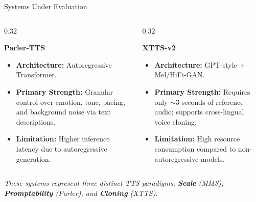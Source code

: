 \documentclass{beamer}
\begin{document}
\begin{frame}{Systems Under Evaluation}
\begin{columns}[t]
        \begin{column}{0.32\textwidth}
            \begin{block}{\centering \textbf{Parler-TTS}}
                \begin{itemize}\footnotesize
                    \setlength\itemsep{0.5em}
                    \item \textbf{Architecture:} Autoregressive Transformer.
                    \item \textbf{Primary Strength:} Granular control over emotion, tone, pacing, and background noise via text descriptions.
                    \item \textbf{Limitation:} Higher inference latency due to autoregressive generation.
                \end{itemize}
                \vspace{0.2cm}
            \end{block}
        \end{column}

        \begin{column}{0.32\textwidth}
            \begin{block}{\centering \textbf{XTTS-v2}}
                \begin{itemize}\footnotesize
                    \setlength\itemsep{0.5em}
                    \item \textbf{Architecture:} GPT-style + Mel/HiFi-GAN.
                    \item \textbf{Primary Strength:} Requires only $\sim$3 seconds of reference audio; supports cross-lingual voice cloning.
                    \item \textbf{Limitation:} High resource consumption compared to non-autoregressive models.
                \end{itemize}
                \vspace{0.2cm}
            \end{block}
        \end{column}

    \end{columns}
    
    \vspace{0.5cm}
    
    \begin{center}
        \textit{\small These systems represent three distinct TTS paradigms: \textbf{Scale} (MMS), \textbf{Promptability} (Parler), and \textbf{Cloning} (XTTS).}
    \end{center}
    
\end{frame}
\end{document}
